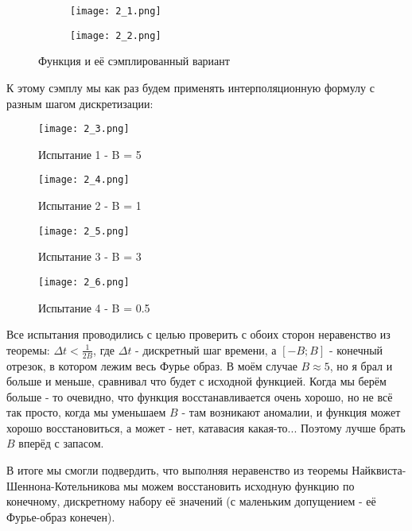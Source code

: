 \begin{figure}[!ht]
	\centering
\hspace*{\fill}%
	\begin{subfigure}[b]{0.49\textwidth}
        \centering
		\texttt{[image: 2\_1.png]}
	\end{subfigure}
\hfill
	\begin{subfigure}[b]{0.49\textwidth}
        \centering
		\texttt{[image: 2\_2.png]}
	\end{subfigure}
    \caption{Функция и её сэмплированный вариант}
\end{figure}
К этому сэмплу мы как раз будем применять интерполяционную формулу с разным шагом дискретизации:
\newpage
\begin{figure}[ht]
    \centering
    \texttt{[image: 2\_3.png]}
	\caption{Испытание 1 - B = 5}
\end{figure}


\begin{figure}[ht]
    \centering
    \texttt{[image: 2\_4.png]}
	\caption{Испытание 2 - B = 1}
\end{figure}

\begin{figure}[ht]
    \centering
    \texttt{[image: 2\_5.png]}
	\caption{Испытание 3 - B = 3}
\end{figure}

\begin{figure}[ht]
    \centering
    \texttt{[image: 2\_6.png]}
	\caption{Испытание 4 - B = 0.5}
\end{figure}
\newpage

Все испытания проводились с целью проверить с обоих сторон неравенство из теоремы: $\Delta t < \frac{1}{2B}$, где $\Delta t$ -  дискретный шаг времени, 
а $[-B; B]$ - конечный отрезок, в котором лежим весь Фурье образ. В моём случае $B\approx 5$, но я брал и больше и меньше, сравнивал что будет с исходной функцией. Когда мы берём больше - то очевидно, что функция восстанавливается очень хорошо, но не всё так просто, когда мы уменьшаем $B$ - там возникают аномалии, и функция может хорошо восстановиться,
а может - нет, катавасия какая-то... Поэтому лучше брать $B$ вперёд с запасом.

В итоге мы смогли подвердить, что выполняя неравенство из теоремы Найквиста-Шеннона-Котельникова мы можем восстановить исходную функцию по конечному, дискретному набору её значений (с маленьким допущением - её Фурье-образ конечен).

